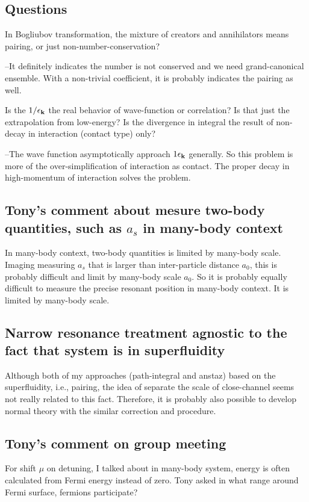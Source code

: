 \subsection{Questions}
In Bogliubov transformation, the mixture of creators and annihilators means pairing, or just non-number-conservation?

--It definitely indicates the number is not conserved and we need grand-canonical ensemble.  With a non-trivial coefficient, it is probably indicates the pairing as well. 

Is the $1/\epsilon_{\mathbf{k}}$ the real behavior of wave-function or correlation?  Is that just the extrapolation from low-energy?  Is the divergence in integral the result of non-decay in interaction (contact type) only? 

--The wave function asymptotically approach $1\epsilon_{\mathbf{k}}$ generally.  So this problem is more of the over-simplification of interaction as contact.  The proper decay in high-momentum of interaction solves the problem. 

\subsection{Tony's comment about mesure two-body quantities, such as $a_{s}$ in many-body context	}
In many-body context, two-body quantities is limited by many-body scale.  Imaging measuring $a_{s}$ that is larger than inter-particle distance $a_{0}$, this is probably difficult and limit by many-body scale $a_{0}$.  So it is probably equally difficult to measure the precise resonant position in many-body context.  It is limited by many-body scale.  

\subsection{Narrow resonance treatment agnostic to the fact that system is in superfluidity}
Although both of my approaches (path-integral and anstaz) based on the superfluidity, i.e., pairing, the idea of separate the scale of close-channel seems not really related to this fact.  Therefore, it is probably also possible to develop normal theory with the similar correction and procedure.  

\subsection{Tony's comment on group meeting}
For shift $\mu$ on detuning, I talked about in many-body system, energy is often calculated from Fermi energy instead of zero.  Tony asked in what range around Fermi surface, fermions participate?

